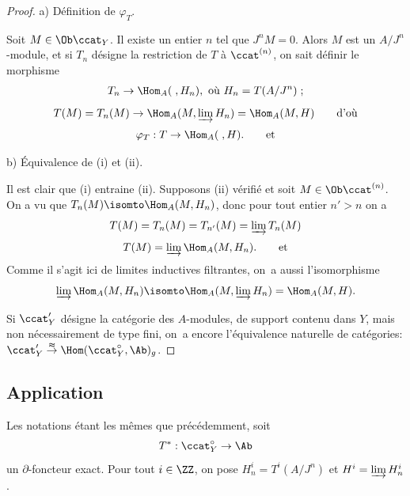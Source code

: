 \begin{proof}
a) D\'efinition de $\varphi_{T}$.

Soit $M\in \Ob \ccat_{Y}$. Il existe un entier $n$ tel que $J^{n}M=0$. Alors $M$ est un $A/J^{n}$-module, et si $T_{n}$ d\'esigne la restriction de $T$ \`a $\ccat^{(n)}$, on sait d\'efinir le morphisme
\begin{eqnarray*}
T_{n}\to \Hom_{A}(\;, H_{n}), \ \hbox{où}\ H_{n}=T(A/J^{n})\;;
\end{eqnarray*}
\begin{equation*} {T(M)=T_{n}(M)\to \Hom_{A}(M, \varinjlim H_{n})= \Hom_{A}(M, H)}\tag*{d'où}
\end{equation*}
\begin{equation*} \varphi_{T}: T\to \Hom_{A}(\;, H).\tag*{et}
\end{equation*}

b) \'Equivalence de (i) et (ii).

Il est clair que (i) entraine (ii). Supposons (ii) v\'erifi\'e et soit $M\in \Ob \ccat^{(n)}$. On a vu que $T_{n}(M)\isomto \Hom_{A}(M, H_{n})$, donc pour tout entier $n'>n$ on a
\begin{equation*} T(M)=T_{n}(M)=T_{n'}(M)=\varinjlim T_{n}(M)
\end{equation*}
\begin{equation*} T(M)=\varinjlim \Hom_{A}(M, H_{n}).\tag*{et}
\end{equation*}
Comme il s'agit ici de limites inductives filtrantes, on~a aussi l'isomorphisme
\begin{equation*} \varinjlim \Hom_{A}(M, H_{n})\isomto \Hom_{A}(M, \varinjlim H_{n}) = \Hom_{A}(M, H).
\end{equation*}

Si $\ccat'_{Y}$ d\'esigne la cat\'egorie des $A$-modules, de support contenu dans $Y$, mais non n\'ecessairement de type fini, on~a encore l'\'equivalence naturelle de cat\'egories: \hbox{$\ccat'_{Y}\overset{\thickapprox}{\to} \Hom (\ccat_{Y}^{\circ}, \Ab)_{g}$}.
\skipqed
\end{proof}

\subsection*{Application}
Les notations \'etant les m\^emes que pr\'ec\'edemment, soit
\begin{equation*} T^{*}:\ccat_{Y}^{\circ}\to{\Ab}
\end{equation*}
un $\partial$-foncteur exact. Pour tout $i\in \ZZ$, on pose $H^{i}_{n}=T^{i}(A/J^{n})$ et $H^{i}=\varinjlim H^{i}_{n}$.

